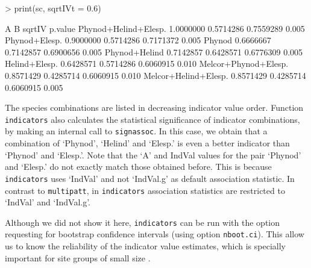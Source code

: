 \documentclass[11pt,a4paper]{article}
\begin{document}
\begin{Schunk}
\begin{Sinput}
> print(sc, sqrtIVt = 0.6)
\end{Sinput}
\begin{Soutput}
                             A         B    sqrtIV p.value
Phynod+Helind+Elesp. 1.0000000 0.5714286 0.7559289   0.005
Phynod+Elesp.        0.9000000 0.5714286 0.7171372   0.005
Phynod               0.6666667 0.7142857 0.6900656   0.005
Phynod+Helind        0.7142857 0.6428571 0.6776309   0.005
Helind+Elesp.        0.6428571 0.5714286 0.6060915   0.010
Melcor+Phynod+Elesp. 0.8571429 0.4285714 0.6060915   0.010
Melcor+Helind+Elesp. 0.8571429 0.4285714 0.6060915   0.005
\end{Soutput}
\end{Schunk}
The species combinations are listed in decreasing indicator value order. Function \texttt{indicators} also calculates the statistical significance of indicator combinations, by making an internal call to \texttt{signassoc}. In this case, we obtain that a combination of `Phynod', `Helind' and `Elesp.' is even a better indicator than `Phynod' and `Elesp.'. Note that the `A' and IndVal values for the pair `Phynod' and `Elesp.' do not exactly match those obtained before. This is because \texttt{indicators} uses `IndVal' and not `IndVal.g' as default association statistic. In contrast to \texttt{multipatt}, in \texttt{indicators} association statistics are restricted to `IndVal' and `IndVal.g'.

Although we did not show it here, \texttt{indicators} can be run with the option requesting for bootstrap confidence intervals (using option \texttt{nboot.ci}). This allow us to know the reliability of the indicator value estimates, which is specially important for site groups of small size \citep{DeCaceres2012}.
\end{document}
